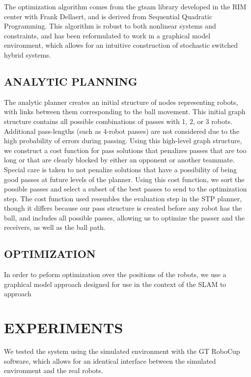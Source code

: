 \documentclass[a4paper, 10pt, conference]{ieeeconf}      %
\begin{document}
The optimization algorithm comes from the gtsam library\cite{Dellaert05rss} developed in the RIM center with Frank Dellaert, and is derived from Sequential Quadratic Programming. This algorithm is robust to both nonlinear systems and constraints, and has been reformulated to work in a graphical model environment, which allows for an intuitive construction of stochastic switched hybrid systems.

\subsection{ANALYTIC PLANNING}
The analytic planner creates an initial structure of nodes representing robots, with links between them corresponding to the ball movement. This initial graph structure contains all possible combinations of passes with 1, 2, or 3 robots. Additional pass-lengths (such as 4-robot passes) are not considered due to the high probability of errors during passing. Using this high-level graph structure, we construct a cost function for pass solutions that penalizes passes that are too long or that are clearly blocked by either an opponent or another teammate. Special care is taken to not penalize solutions that have a possibility of being good passes at future levels of the planner. Using this cost function, we sort the possible passes and select a subset of the best passes to send to the optimization step.
The cost function used resembles the evaluation step in the STP planner, though it differs because our pass structure is created before any robot has the ball, and includes all possible passes, allowing us to optimize the passer and the receivers, as well as the ball path.

\subsection{OPTIMIZATION}
In order to peform optimization over the positions of the robots, we use a graphical model approach designed for use in the context of the SLAM to approach 

\section{EXPERIMENTS}
We tested the system using the simulated environment with the GT RoboCup software, which allows for an identical interface between the simulated environment and the real robots.  
\end{document}
